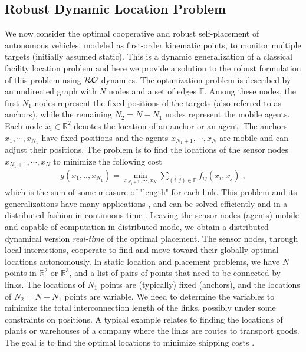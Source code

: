 \documentclass[journal,twoside,web]{ieeecolor}
\begin{document}

\subsection{Robust Dynamic Location Problem}
We now consider the optimal cooperative and robust self-placement of autonomous vehicles, modeled as first-order kinematic points, to monitor multiple targets (initially assumed static). This is a dynamic generalization of a classical facility location problem \cite{farahani2009} and here we provide a solution to the robust formulation of this problem using ${\cal RO}$ dynamics. The optimization problem is described by an undirected graph with $N$ nodes and a set of edges ${\mathbb E}$. Among these nodes, the first $N_1$ nodes represent the fixed positions of the targets (also referred to as anchors), while the remaining $N_2 = N - N_1$ nodes represent the mobile agents. Each node $x_i\in \mathbb{R}^2$ denotes the location of an anchor or an agent. The anchors $x_1,\cdots,x_{N_1}$ have fixed positions and the agents $x_{N_1+1},\cdots,x_{N}$ are mobile and can adjust their positions. The problem is to find the locations of the sensor nodes $x_{N_1+1},\cdots, x_N$ to minimize the following cost
\begin{align*}
g(x_1,..,x_{N_1})=\min_{x_{N_1+1},\cdots,x_N} \sum_{(i,j)\in {\mathbb E}}
f_{ij}(x_i, x_j)\;,
\end{align*}
which is the sum of some measure of "length" for each link. This problem and its generalizations have many applications \cite{boyd2004}, and can be solved efficiently and in a distributed fashion in continuous time \cite{wang2011}. Leaving the sensor nodes (agents) mobile and capable of computation in distributed mode, we obtain a distributed dynamical version \emph{real-time} of the optimal placement. The sensor nodes, through local interactions, cooperate to find and move toward their globally optimal locations autonomously. 
\iffalse
In static location and placement problems, we have $N$ points in $\mathbb{R}^2$ or $\mathbb{R}^3$, and a list of pairs of points that need to be connected by links. The locations of $N_1$ points are (typically) fixed (anchors), and the locations of $N_2=N-N_1$ points are variable. We need to determine the variables to minimize the total interconnection length of the links, possibly under some constraints on positions. 
A typical example relates to finding the locations of plants or warehouses of a company where the links are routes to transport goods. The goal is to find the optimal locations to minimize shipping costs \cite{boyd2004}. 
\end{document}
